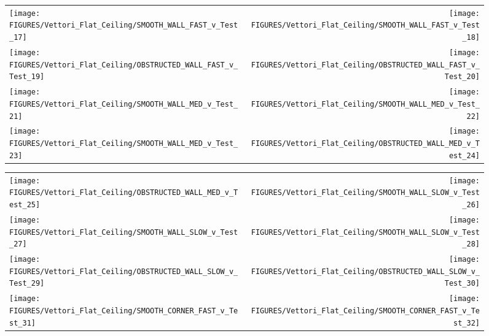 \begin{figure}[p]
\begin{tabular*}{\textwidth}{l@{\extracolsep{\fill}}r}
\texttt{[image: FIGURES/Vettori\_Flat\_Ceiling/SMOOTH\_WALL\_FAST\_v\_Test\_17]} &
\texttt{[image: FIGURES/Vettori\_Flat\_Ceiling/SMOOTH\_WALL\_FAST\_v\_Test\_18]} \\
\texttt{[image: FIGURES/Vettori\_Flat\_Ceiling/OBSTRUCTED\_WALL\_FAST\_v\_Test\_19]} &
\texttt{[image: FIGURES/Vettori\_Flat\_Ceiling/OBSTRUCTED\_WALL\_FAST\_v\_Test\_20]} \\
\texttt{[image: FIGURES/Vettori\_Flat\_Ceiling/SMOOTH\_WALL\_MED\_v\_Test\_21]} &
\texttt{[image: FIGURES/Vettori\_Flat\_Ceiling/SMOOTH\_WALL\_MED\_v\_Test\_22]} \\
\texttt{[image: FIGURES/Vettori\_Flat\_Ceiling/SMOOTH\_WALL\_MED\_v\_Test\_23]} &
\texttt{[image: FIGURES/Vettori\_Flat\_Ceiling/OBSTRUCTED\_WALL\_MED\_v\_Test\_24]} \\
\end{tabular*}
\label{Vettori_3}
\end{figure}

\begin{figure}[p]
\begin{tabular*}{\textwidth}{l@{\extracolsep{\fill}}r}
\texttt{[image: FIGURES/Vettori\_Flat\_Ceiling/OBSTRUCTED\_WALL\_MED\_v\_Test\_25]} &
\texttt{[image: FIGURES/Vettori\_Flat\_Ceiling/SMOOTH\_WALL\_SLOW\_v\_Test\_26]} \\
\texttt{[image: FIGURES/Vettori\_Flat\_Ceiling/SMOOTH\_WALL\_SLOW\_v\_Test\_27]} &
\texttt{[image: FIGURES/Vettori\_Flat\_Ceiling/SMOOTH\_WALL\_SLOW\_v\_Test\_28]} \\
\texttt{[image: FIGURES/Vettori\_Flat\_Ceiling/OBSTRUCTED\_WALL\_SLOW\_v\_Test\_29]} &
\texttt{[image: FIGURES/Vettori\_Flat\_Ceiling/OBSTRUCTED\_WALL\_SLOW\_v\_Test\_30]} \\
\texttt{[image: FIGURES/Vettori\_Flat\_Ceiling/SMOOTH\_CORNER\_FAST\_v\_Test\_31]} &
\texttt{[image: FIGURES/Vettori\_Flat\_Ceiling/SMOOTH\_CORNER\_FAST\_v\_Test\_32]} \\
\end{tabular*}
\label{Vettori_4}
\end{figure}


